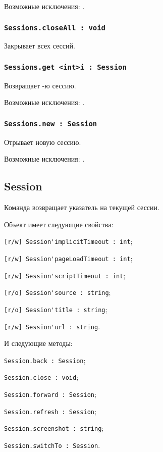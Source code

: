 Возможные исключения: .

\subsubsection{\lstinline|Sessions.closeAll : void|}

Закрывает всех сессий.

\subsubsection{\lstinline|Sessions.get <int>i : Session|}

Возвращает -ю сессию.

Возможные исключения: .

\subsubsection{\lstinline|Sessions.new : Session|}

Отрывает новую сессию.

Возможные исключения: .

\subsection{{\color{orange} Session}}

Команда \session{} возвращает указатель на текущей сессии.

Объект \session{} имеет следующие свойства:
\begin{icItems}
	\item \lstinline|[r/w] Session'implicitTimeout : int|;
	\item \lstinline|[r/w] Session'pageLoadTimeout : int|;
	\item \lstinline|[r/w] Session'scriptTimeout : int|;
	\item \lstinline|[r/o] Session'source : string|;
	\item \lstinline|[r/o] Session'title : string|;
	\item \lstinline|[r/w] Session'url : string|.
\end{icItems}

И следующие методы:
\begin{icItems}
	\item \lstinline|Session.back : Session|;
	\item \lstinline|Session.close : void|;
	\item \lstinline|Session.forward : Session|;
	\item \lstinline|Session.refresh : Session|;
	\item \lstinline|Session.screenshot : string|;
	\item \lstinline|Session.switchTo : Session|.
\end{icItems}

